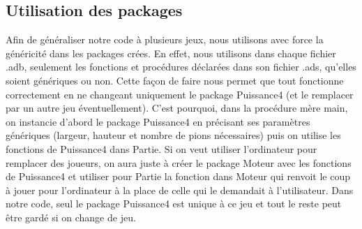 \documentclass[a4paper, 10pt, french]{article}
\begin{document}
{    \subsection{Utilisation des packages}
    {
        Afin de généraliser notre code à plusieurs jeux, nous utilisons avec force la généricité dans les packages crées.
        En effet, nous utilisons dans chaque fichier .adb, seulement les fonctions et procédures déclarées dans son fichier
        .ads, qu'elles soient génériques ou non. Cette façon de faire nous permet que tout fonctionne correctement en ne changeant
        uniquement le package Puissance4 (et le remplacer par un autre jeu éventuellement).
        C'est pourquoi, dans la procédure mère main, on instancie d'abord le package Puissance4 en précisant ses paramètres
        génériques (largeur, hauteur et nombre de pions nécessaires) puis on utilise les fonctions de Puissance4 dans Partie.
        Si on veut utiliser l'ordinateur pour remplacer des joueurs, on aura juste à créer le package Moteur avec les fonctions
        de Puissance4 et utiliser pour Partie la fonction dans Moteur qui renvoit le coup à jouer pour l'ordinateur à la place de
        celle qui le demandait à l'utilisateur.
        Dans notre code, seul le package Puissance4 est unique à ce jeu et tout le reste peut être gardé si on change de jeu.
    }

    \newpage
} 

\end{document}
